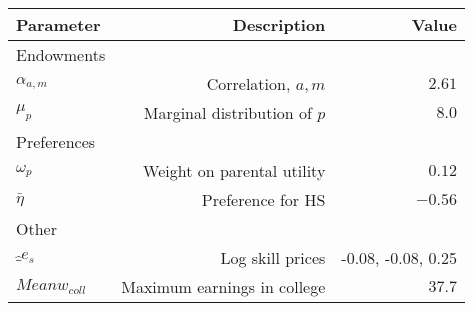 \begin{tabular}{lrr}
\hline
Parameter & Description  & Value  \\
\hline
Endowments &   &   \\
$\alpha_{a,m}$ & Correlation, $a,m$  & $2.61$  \\
$\mu_{p}$ & Marginal distribution of $p$  & $8.0$  \\
Preferences &   &   \\
$\omega_{p}$ & Weight on parental utility  & $0.12$  \\
$\bar{\eta}$ & Preference for HS  & $-0.56$  \\
Other &   &   \\
$\hat_{e}_{s}$ & Log skill prices  & -0.08, -0.08, 0.25  \\
$Mean w_{coll}$ & Maximum earnings in college  & $37.7$  \\
\hline
\end{tabular}%
